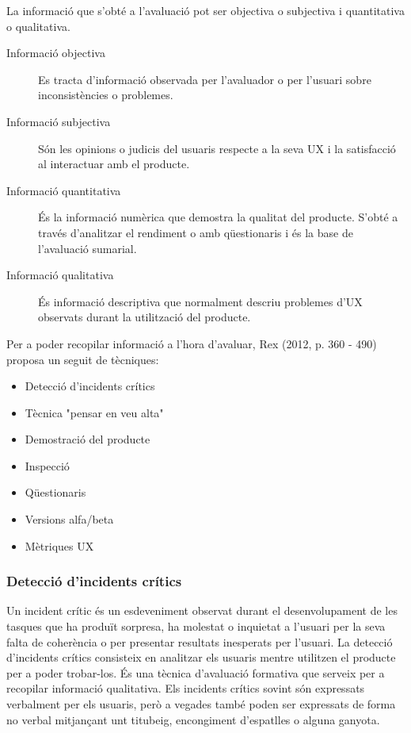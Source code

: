 La informació que s'obté a l'avaluació pot ser objectiva o subjectiva i quantitativa o qualitativa.

\begin{description}
\item[Informació objectiva] Es tracta d'informació observada per l'avaluador o per l'usuari sobre inconsistències o problemes. 
\item[Informació subjectiva] Són les opinions o judicis del usuaris respecte a la seva \ac{UX} i la satisfacció al interactuar amb el producte. 
\item[Informació quantitativa] És la informació numèrica que demostra la qualitat del producte. S'obté a través d'analitzar el rendiment o amb qüestionaris i és la base de l'avaluació sumarial.
\item[Informació qualitativa] És informació descriptiva que normalment descriu problemes d'\ac{UX} observats durant la utilització del producte.
\end{description}

Per a poder recopilar informació a l'hora d'avaluar, Rex (2012, p. 360 - 490) \cite{UX_Book} proposa un seguit de tècniques:

\begin{itemize}
\item Detecció d'incidents crítics
\item Tècnica "pensar en veu alta"
\item Demostració del producte
\item Inspecció 
\item Qüestionaris
\item Versions alfa/beta
\item Mètriques \ac{UX}
\end{itemize}

\subsubsection{Detecció d'incidents crítics}
Un incident crític és un esdeveniment observat durant el desenvolupament de les tasques que ha produït sorpresa, ha molestat o inquietat a l'usuari per la seva falta de coherència o per presentar resultats inesperats per l'usuari. La detecció d'incidents crítics consisteix en analitzar els usuaris mentre utilitzen el producte per a poder trobar-los. És una tècnica d'avaluació formativa que serveix per a recopilar informació qualitativa. Els incidents crítics sovint són expressats verbalment per els usuaris, però a vegades també poden ser expressats de forma no verbal mitjançant unt titubeig, encongiment d'espatlles o alguna ganyota. 
